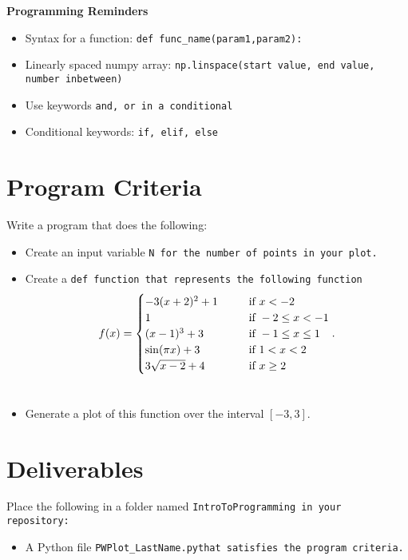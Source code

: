 \documentclass{article}
\def\prog#1{
\vspace{.1in}\begin{mdframed} \begin{center} \textbf{Programming Reminders} \end{center}#1 \end{mdframed} }
\newcommand\foldername{\tt{IntroToProgramming} }
\newcommand\filename{\tt{PWPlot\_LastName.py}\;\;}
\begin{document}
	
	
	
	
	\prog{
		\begin{itemize}
			\item Syntax for a function: \tt{def func\_name(param1,param2):}
			\item Linearly spaced numpy array: \tt{np.linspace(start value, end value, number inbetween)}
			\item Use keywords \tt{and}, \tt{or} in a conditional
			\item Conditional keywords: \tt{if}, \tt{elif}, \tt{else}
		\end{itemize}
		}




\section*{Program Criteria}
	Write a program that does the following:
	\begin{itemize}
		\item Create an input variable \tt{N} for the number of points in your plot.
		\item Create a \tt{def} function that represents the following function
		\[ f(x) = \begin{cases}
 		-3(x+2)^2 + 1 \hspace{.2in}& \text{ if } x < -2 \\
 		1 & \text{ if }-2 \leq x < -1 \\
 		(x-1)^3 + 3 & \text{ if }-1 \leq x \leq 1 \\
 		\sin(\pi x) + 3 & \text{ if }1 < x < 2	\\
 		3 \sqrt{x-2} + 4& \text{ if }x \geq 2
 \end{cases}
.  \]
		\item Generate a plot of this function over the interval $[-3,3]$.
	\end{itemize}







\section*{Deliverables}
	
	Place the following in a folder named \foldername in your repository:
	\begin{itemize}
		\item A Python file \filename  that satisfies the program criteria.
	\end{itemize}

	
\end{document}
